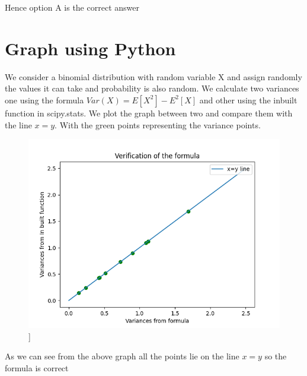 \documentclass[journal,12pt,twocolumn]{IEEEtran}
\providecommand{\brak}[1]{\ensuremath{\left(#1\right)}}
\begin{document}
Hence option A is the correct answer







\section*{Graph using Python}
We consider a binomial distribution with random variable X and assign randomly the values it can take and probability is also random. We calculate two variances one using the formula $Var\brak{X}=E[X^2]-E^2[X]$ and other using the inbuilt function in scipy.stats. We plot the graph between two and compare them with the line $x=y$. With the green points representing the variance points.

\begin{figure}[ht]
\includegraphics[scale = 0.7]{ogimage}]
\end{figure}
As we can see from the above graph all the points lie on the line $x=y$ so the formula is correct \\\\
\end{document}
